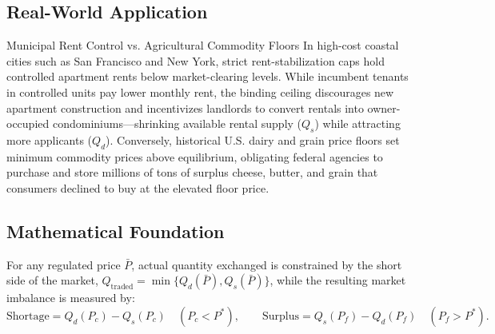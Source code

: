 \documentclass[11pt,letterpaper]{article}
\begin{document}
\subsection*{Real-World Application}
\begin{examplecase}{Municipal Rent Control vs. Agricultural Commodity Floors}
In high-cost coastal cities such as San Francisco and New York, strict rent-stabilization caps hold controlled apartment rents below market-clearing levels. While incumbent tenants in controlled units pay lower monthly rent, the binding ceiling discourages new apartment construction and incentivizes landlords to convert rentals into owner-occupied condominiums—shrinking available rental supply ($Q_s$) while attracting more applicants ($Q_d$). Conversely, historical U.S. dairy and grain price floors set minimum commodity prices above equilibrium, obligating federal agencies to purchase and store millions of tons of surplus cheese, butter, and grain that consumers declined to buy at the elevated floor price.
\end{examplecase}

\subsection*{Mathematical Foundation}
For any regulated price $\bar{P}$, actual quantity exchanged is constrained by the short side of the market, $Q_{\text{traded}} = \min\{Q_d(\bar{P}), Q_s(\bar{P})\}$, while the resulting market imbalance is measured by:
\begin{equation}
\text{Shortage} = Q_d(P_c) - Q_s(P_c) \quad (P_c < P^*), \qquad \text{Surplus} = Q_s(P_f) - Q_d(P_f) \quad (P_f > P^*).
\end{equation}
\end{document}
